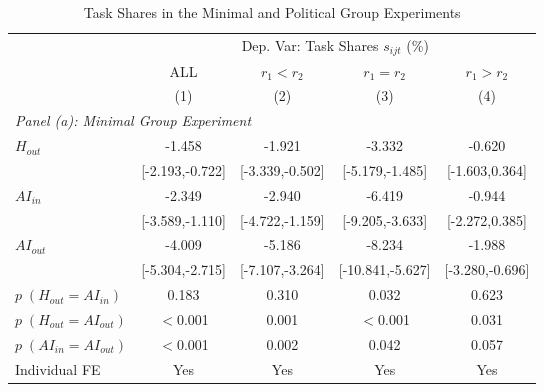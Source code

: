 \begin{table}[H]
\centering
\caption{Task Shares in the Minimal and Political Group Experiments}
\footnotesize
\begin{threeparttable}
\begin{tabular}{l*{4}{c}}
\toprule\toprule
 & \multicolumn{4}{c}{Dep. Var: Task Shares $s_{ijt}$ (\%)} \\
\cmidrule(lr){2-5}
 & ALL & $r_1 < r_2$ & $r_1 = r_2$ & $r_1 > r_2$ \\
            &\multicolumn{1}{c}{(1)}         &\multicolumn{1}{c}{(2)}         &\multicolumn{1}{c}{(3)}         &\multicolumn{1}{c}{(4)}         \\
\midrule
\multicolumn{5}{l}{\textit{Panel (a): Minimal Group Experiment}} \\
$H_{out}$   &                -1.458\sym{***}&                -1.921\sym{**} &                -3.332\sym{***}&                -0.620         \\
            &       [-2.193,-0.722]         &       [-3.339,-0.502]         &       [-5.179,-1.485]         &        [-1.603,0.364]         \\
\addlinespace
$AI_{in}$   &                -2.349\sym{***}&                -2.940\sym{**} &                -6.419\sym{***}&                -0.944         \\
            &       [-3.589,-1.110]         &       [-4.722,-1.159]         &       [-9.205,-3.633]         &        [-2.272,0.385]         \\
\addlinespace
$AI_{out}$  &                -4.009\sym{***}&                -5.186\sym{***}&                -8.234\sym{***}&                -1.988\sym{**} \\
            &       [-5.304,-2.715]         &       [-7.107,-3.264]         &      [-10.841,-5.627]         &       [-3.280,-0.696]         \\
\midrule
$p\;(H_{out} = AI_{in})$&                 0.183         &                 0.310         &                 0.032         &                 0.623         \\
$p\;(H_{out} = AI_{out})$&              $<$0.001         &                 0.001         &              $<$0.001         &                 0.031         \\
$p\;(AI_{in} = AI_{out})$&              $<$0.001         &                 0.002         &                 0.042         &                 0.057         \\
Individual FE&                   Yes         &                   Yes         &                   Yes         &                   Yes         \\

\end{tabular}
\end{threeparttable}
\end{table}
